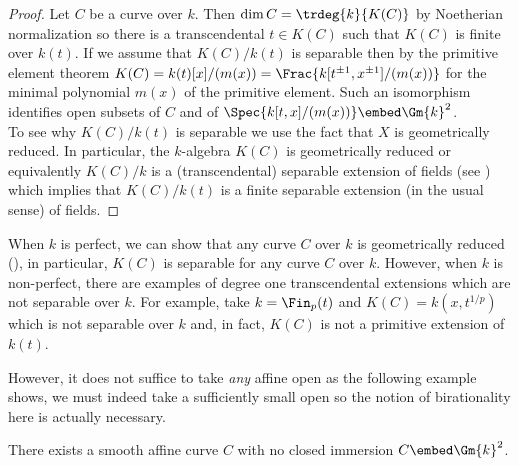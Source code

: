 \begin{proof}
Let $C$ be a curve over $k$. Then $\dim{C} = \trdeg{k}{K(C)}$ by Noetherian normalization so there is a transcendental $t \in K(C)$ such that $K(C)$ is finite over $k(t)$. If we assume that $K(C)  / k(t)$ is separable then by the primitive element theorem $K(C) = k(t)[x]/(m(x)) = \Frac{k[t^{\pm 1}, x^{\pm 1}]/(m(x))}$ for the minimal polynomial $m(x)$ of the primitive element. Such an isomorphism identifies open subsets of $C$ and of $\Spec{k[t, x]/(m(x))} \embed \Gm{k}^2$. 
\bigskip\\
To see why $K(C) / k(t)$ is separable we use the fact that $X$ is geometrically reduced. In particular, the $k$-algebra $K(C)$ is geometrically reduced or equivalently $K(C) / k$ is a (transcendental) separable extension of fields (see \cite[\href{https://stacks.math.columbia.edu/tag/030W}{Tag 030W}]{stacks-project}) which implies that $K(C) / k(t)$ is a finite separable extension (in the usual sense) of fields.
\end{proof}


\begin{rmk}
When $k$ is perfect, we can show that any curve $C$ over $k$ is geometrically reduced (\cite[\href{https://stacks.math.columbia.edu/tag/020I}{Tag 020I}]{stacks-project}), in particular, $K(C)$ is separable for any curve $C$ over $k$. However, when $k$ is non-perfect, there are examples of degree one transcendental extensions which are not separable over $k$. For example, take $k = \Fin_p(t)$ and $K(C) = k(x, t^{1/p})$ which is not separable over $k$ and, in fact, $K(C)$ is not a primitive extension of $k(t)$. 
\end{rmk}


\noindent
However, it does not suffice to take \textit{any} affine open as the following example shows, we must indeed take a sufficiently small open so the notion of birationality here is actually necessary.

\begin{prop}
There exists a smooth affine curve $C$ with no closed immersion $C \embed \Gm{k}^2$. 
\end{prop}

